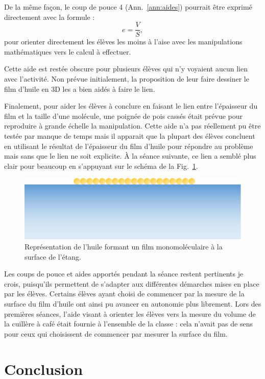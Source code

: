 \documentclass[12pt,a4paper, fleqn]{report}
\begin{document}
De la même façon, le coup de pouce 4 (Ann.~\ref{ann:aides}) pourrait être exprimé directement avec la formule :
\[e = \frac{V}{S}, \]
pour orienter directement les élèves les moins à l'aise avec les manipulations mathématiques vers le calcul à effectuer.

Cette aide est restée obscure pour plusieurs élèves qui n'y voyaient aucun lien avec l'activité.
Non prévue initialement, la proposition de leur faire dessiner le film d'huile en 3D les a bien aidés à faire le lien.

Finalement, pour aider les élèves à conclure en faisant le lien entre l'épaisseur du film et la taille d'une molécule, une poignée de pois cassés était prévue pour reproduire à grande échelle la manipulation.
Cette aide n'a pas réellement pu être testée par manque de temps mais il apparait que la plupart des élèves concluent en utilisant le résultat de l'épaisseur du film d'huile pour répondre au problème mais sans que le lien ne soit explicite.
À la séance suivante, ce lien a semblé plus clair pour beaucoup en s'appuyant sur le schéma de la Fig.~\ref{fig:exp}.

\begin{figure}[htbp]
\center
\includegraphics[scale=.25]{experience.png}
\caption{Représentation de l'huile formant un film monomoléculaire à la surface de l'étang.}
\label{fig:exp}
\end{figure}

Les coups de pouce et aides apportés pendant la séance restent pertinents je crois, puisqu'ils permettent de s'adapter aux différentes démarches mises en place par les élèves.
Certains élèves ayant choisi de commencer par la mesure de la surface du film d'huile ont ainsi pu avancer en autonomie plus librement.
Lors des premières séances, l'aide visant à orienter les élèves vers la mesure du volume de la cuillère à café était fournie à l'ensemble de la classe : cela n'avait pas de sens pour ceux qui choisissent de commencer par mesurer la surface du film.

\section*{Conclusion}
\end{document}
